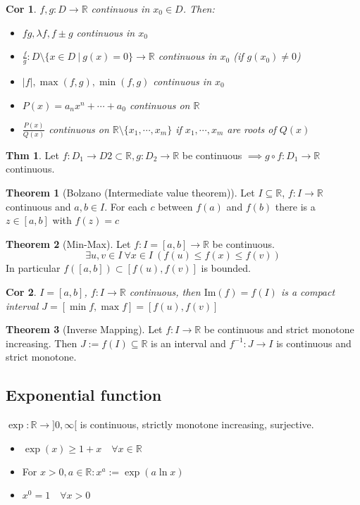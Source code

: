 \documentclass[a4paper, 10pt]{article}
\newtheorem*{corollary}{Cor}
\theoremstyle{definition}
\newtheorem*{theorem}{Thm}
\theoremstyle{ex}
\theoremstyle{named}
\newtheorem*{ntheorem_wrapper}{Theorem}
\newenvironment{ntheorem}%
    {\begin{mdframed}[style=important]\begin{ntheorem_wrapper}}%
    {\end{ntheorem_wrapper}\end{mdframed}}
\newcommand{\R}{\mathbb{R}}
\begin{document}
\begin{corollary}
    $f, g: D \to \R$ continuous in $x_0 \in D$. Then:
    \begin{itemize}
        \item $fg, \lambda f, f \pm g$ continuous in $x_0$
        \item $\frac{f}{g}: D \setminus \{x \in D \ | \ g(x) = 0\} \to \R$ continuous in $x_0$ (if $g(x_0) \neq 0$)
        \item $|f|, \max(f, g), \min(f, g)$ continuous in $x_0$
        \item $P(x) = a_n x^n + \cdots + a_0$ continuous on $\R$
        \item $\frac{P(x)}{Q(x)}$ continuous on $\R \setminus \{x_1, \cdots, x_m\}$ if $x_1, \cdots, x_m$ are roots of $Q(x)$
    \end{itemize}
\end{corollary}

\begin{theorem}
    Let $f: D_1 \to D2 \subset \R, g: D_2 \to \R$ be continuous $\implies g \circ f : D_1 \to \R$ continuous.
\end{theorem}

\begin{ntheorem}[Bolzano (Intermediate value theorem)]
    Let $I \subseteq \R$, $f : I \to \R$ continuous and $a, b \in I$. For each $c$ between $f(a)$ and $f(b)$ there is a $z \in [a, b]$ with $f(z) = c$
\end{ntheorem}

\begin{ntheorem}[Min-Max]
    Let $f: I = [a, b] \to \R$ be continuous.
    $$\exists u, v \in I \ \forall x \in I \ (f(u) \leq f(x) \leq f(v))$$
    In particular $f([a, b]) \subset [f(u), f(v)]$ is bounded.
\end{ntheorem}

\begin{corollary}
    $I = [a, b]$, $f: I \to \R$ continuous, then $\text{Im}(f) = f(I)$ is a compact interval $J = [\min f, \max f] = [f(u), f(v)]$
\end{corollary}

\begin{ntheorem}[Inverse Mapping]
    Let $f: I \to \R$ be continuous and strict monotone increasing. Then $J := f(I) \subseteq \R$ is an interval and $f^{-1}: J \to I$ is continuous and strict monotone.
\end{ntheorem}

\subsection{Exponential function}
$\exp: \R \to ]0, \infty [$ is continuous, strictly monotone increasing, surjective.
\begin{itemize}
    \item $\exp(x) \geq 1 + x \quad \forall x \in \R$
    \item For $x > 0, a \in \R: x^a := \exp(a \ln x)$
    \item $x^0 = 1 \quad \forall x > 0$
\end{itemize}
\end{document}
